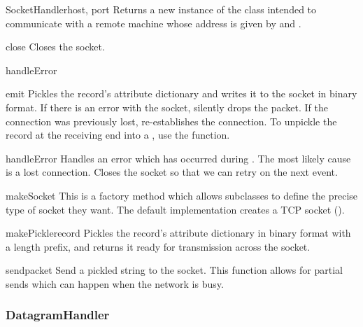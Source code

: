 \begin{classdesc}{SocketHandler}{host, port}
Returns a new instance of the  class intended to
communicate with a remote machine whose address is given by 
and .
\end{classdesc}

\begin{methoddesc}{close}{}
Closes the socket.
\end{methoddesc}

\begin{methoddesc}{handleError}{}
\end{methoddesc}

\begin{methoddesc}{emit}{}
Pickles the record's attribute dictionary and writes it to the socket in
binary format. If there is an error with the socket, silently drops the
packet. If the connection was previously lost, re-establishes the connection.
To unpickle the record at the receiving end into a , use the
 function.
\end{methoddesc}

\begin{methoddesc}{handleError}{}
Handles an error which has occurred during . The
most likely cause is a lost connection. Closes the socket so that
we can retry on the next event.
\end{methoddesc}

\begin{methoddesc}{makeSocket}{}
This is a factory method which allows subclasses to define the precise
type of socket they want. The default implementation creates a TCP
socket ().
\end{methoddesc}

\begin{methoddesc}{makePickle}{record}
Pickles the record's attribute dictionary in binary format with a length
prefix, and returns it ready for transmission across the socket.
\end{methoddesc}

\begin{methoddesc}{send}{packet}
Send a pickled string  to the socket. This function allows
for partial sends which can happen when the network is busy.
\end{methoddesc}

\subsubsection{DatagramHandler}

